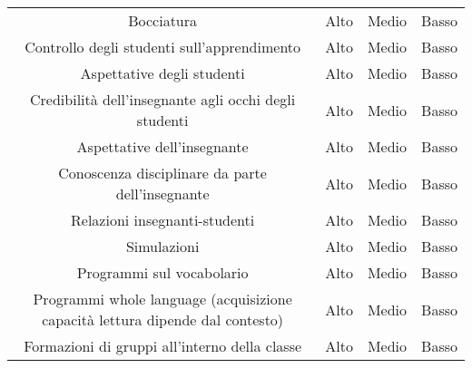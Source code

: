 \documentclass[a4paper]{article}
\begin{document}
\begin{center}
\begin{tabular}[h!]{|c|c|c|c|}
			Bocciatura & Alto & Medio & Basso\\
			Controllo degli studenti sull'apprendimento & Alto & Medio & Basso\\
			Aspettative degli studenti & Alto & Medio & Basso\\
			Credibilità dell'insegnante agli occhi degli studenti & Alto & Medio & Basso\\
			Aspettative dell'insegnante & Alto & Medio & Basso\\
			Conoscenza disciplinare da parte dell'insegnante & Alto & Medio & Basso\\
			Relazioni insegnanti-studenti & Alto & Medio & Basso\\
			Simulazioni & Alto & Medio & Basso\\
			Programmi sul vocabolario & Alto & Medio & Basso\\
			Programmi whole language (acquisizione capacità lettura dipende dal contesto) & Alto & Medio & Basso\\
			Formazioni di gruppi all'interno della classe & Alto & Medio & Basso\\
			\bottomrule
		\end{tabular}
	\end{center}
	
\end{document}
